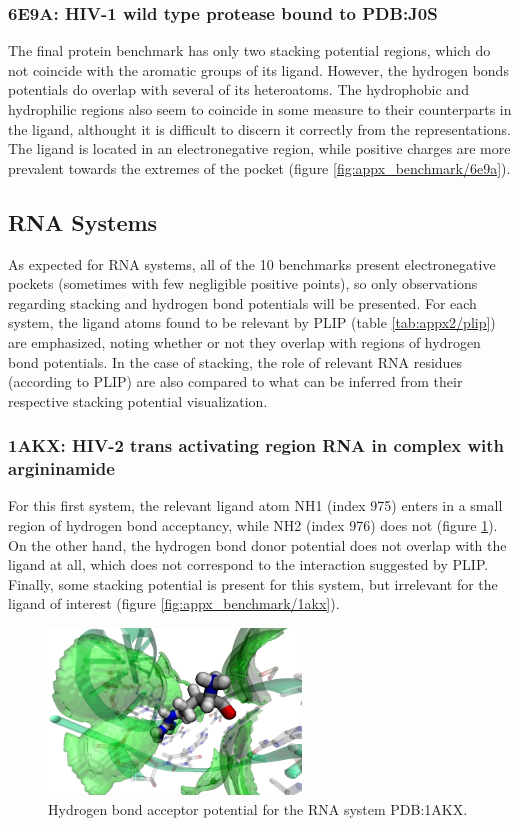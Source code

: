     \subsubsection{6E9A: HIV-1 wild type protease bound to PDB:J0S}
      The final protein benchmark has only two stacking potential regions, which do not coincide with the aromatic groups of its ligand. However, the hydrogen bonds potentials do overlap with several of its heteroatoms. The hydrophobic and hydrophilic regions also seem to coincide in some measure to their counterparts in the ligand, althought it is difficult to discern it correctly from the representations. The ligand is located in an electronegative region, while positive charges are more prevalent towards the extremes of the pocket (figure \ref{fig:appx_benchmark/6e9a}).

  \subsection{RNA Systems}
    As expected for RNA systems, all of the 10 benchmarks present electronegative pockets (sometimes with few negligible positive points), so only observations regarding stacking and hydrogen bond potentials will be presented. For each system, the ligand atoms found to be relevant by PLIP (table \ref{tab:appx2/plip}) are emphasized, noting whether or not they overlap with regions of hydrogen bond potentials. In the case of stacking, the role of relevant RNA residues (according to PLIP) are also compared to what can be inferred from their respective stacking potential visualization.

    \subsubsection{1AKX: HIV-2 trans activating region RNA in complex with argininamide}
      For this first system, the relevant ligand atom NH1 (index 975) enters in a small region of hydrogen bond acceptancy, while NH2 (index 976) does not (figure \ref{fig:benchmark/1akx}). On the other hand, the hydrogen bond donor potential does not overlap with the ligand at all, which does not correspond to the interaction suggested by PLIP. Finally, some stacking potential is present for this system, but irrelevant for the ligand of interest (figure \ref{fig:appx_benchmark/1akx}).

      \begin{figure}[H]
        \centering
        \includegraphics[width=0.6\textwidth]{figures/results/benchmark_rna/1akx.png}
        \caption{\label{fig:benchmark/1akx} Hydrogen bond acceptor potential for the RNA system PDB:1AKX.}
      \end{figure}

